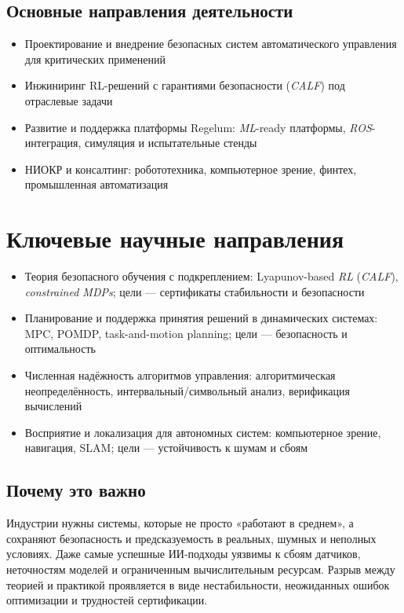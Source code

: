 \documentclass[12pt,a4paper]{article}
\begin{document}
\subsection*{Основные направления деятельности}
\begin{itemize}
    \item Проектирование и внедрение безопасных систем автоматического управления для критических применений
    \item Инжиниринг RL-решений с гарантиями безопасности (\textit{CALF}) под отраслевые задачи
    \item Развитие и поддержка платформы Regelum: \textit{ML}-ready платформы, \textit{ROS}-интеграция, симуляция и испытательные стенды
    \item НИОКР и консалтинг: робототехника, компьютерное зрение, финтех, промышленная автоматизация
\end{itemize}

\section{Ключевые научные направления}
\begin{itemize}
    \item Теория безопасного обучения с подкреплением: Lyapunov-based \textit{RL} (\textit{CALF}), \textit{constrained MDPs}; цели --- сертификаты стабильности и безопасности
    \item Планирование и поддержка принятия решений в динамических системах: MPC, POMDP, task-and-motion planning; цели --- безопасность и оптимальность
    \item Численная надёжность алгоритмов управления: алгоритмическая неопределённость, интервальный/символьный анализ, верификация вычислений
    \item Восприятие и локализация для автономных систем: компьютерное зрение, навигация, SLAM; цели --- устойчивость к шумам и сбоям
\end{itemize}

\subsection*{Почему это важно}
Индустрии нужны системы, которые не просто «работают в среднем», а сохраняют безопасность и предсказуемость в реальных, шумных и неполных условиях. Даже самые успешные ИИ‑подходы уязвимы к сбоям датчиков, неточностям моделей и ограниченным вычислительным ресурсам. Разрыв между теорией и практикой проявляется в виде нестабильности, неожиданных ошибок оптимизации и трудностей сертификации.
\end{document}
